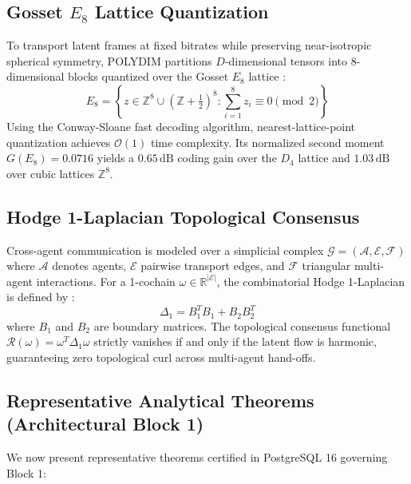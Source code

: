 \documentclass[journal,10pt,compsoc]{IEEEtran}
\theoremstyle{plain}
\theoremstyle{definition}
\begin{document}
\subsection{Gosset $E_8$ Lattice Quantization}
To transport latent frames at fixed bitrates while preserving near-isotropic spherical symmetry, POLYDIM partitions $D$-dimensional tensors into 8-dimensional blocks quantized over the Gosset $E_8$ lattice \cite{conway1998sphere}:
\begin{equation}
\label{eq:e8_lattice}
E_8 = \left\{ z \in \mathbb{Z}^8 \cup \left(\mathbb{Z} + \tfrac{1}{2}\right)^8 : \sum_{i=1}^8 z_i \equiv 0 \pmod 2 \right\}
\end{equation}
Using the Conway-Sloane fast decoding algorithm, nearest-lattice-point quantization achieves $\mathcal{O}(1)$ time complexity. Its normalized second moment $G(E_8) = 0.0716$ yields a $0.65\,\text{dB}$ coding gain over the $D_4$ lattice and $1.03\,\text{dB}$ over cubic lattices $\mathbb{Z}^8$.

\subsection{Hodge 1-Laplacian Topological Consensus}
Cross-agent communication is modeled over a simplicial complex $\mathcal{G} = (\mathcal{A}, \mathcal{E}, \mathcal{F})$ where $\mathcal{A}$ denotes agents, $\mathcal{E}$ pairwise transport edges, and $\mathcal{F}$ triangular multi-agent interactions. For a 1-cochain $\omega \in \mathbb{R}^{|\mathcal{E}|}$, the combinatorial Hodge 1-Laplacian is defined by \cite{hodge1941theory}:
\begin{equation}
\label{eq:hodge_laplacian}
\Delta_1 = B_1^T B_1 + B_2 B_2^T
\end{equation}
where $B_1$ and $B_2$ are boundary matrices. The topological consensus functional $\mathcal{R}(\omega) = \omega^T \Delta_1 \omega$ strictly vanishes if and only if the latent flow is harmonic, guaranteeing zero topological curl across multi-agent hand-offs.

\subsection{Representative Analytical Theorems (Architectural Block 1)}
We now present representative theorems certified in PostgreSQL 16 governing Block 1:
\end{document}
